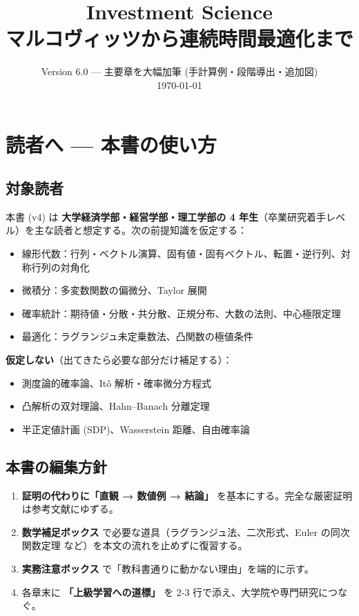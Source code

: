 \documentclass[11pt,a4paper]{report}
\title{Investment Science \\ \large マルコヴィッツから連続時間最適化まで}
\author{}
\date{Version 6.0 — 主要章を大幅加筆 (手計算例・段階導出・追加図) \\ \today}
\begin{document}
\maketitle
\tableofcontents
\clearpage

\chapter{読者へ — 本書の使い方}

\section{対象読者}

本書 (v4) は \textbf{大学経済学部・経営学部・理工学部の 4 年生}（卒業研究着手レベル）を主な読者と想定する。次の前提知識を仮定する：

\begin{itemize}
\item 線形代数：行列・ベクトル演算、固有値・固有ベクトル、転置・逆行列、対称行列の対角化
\item 微積分：多変数関数の偏微分、Taylor 展開
\item 確率統計：期待値・分散・共分散、正規分布、大数の法則、中心極限定理
\item 最適化：ラグランジュ未定乗数法、凸関数の極値条件
\end{itemize}

\textbf{仮定しない}（出てきたら必要な部分だけ補足する）：
\begin{itemize}
\item 測度論的確率論、Itô 解析・確率微分方程式
\item 凸解析の双対理論、Hahn–Banach 分離定理
\item 半正定値計画 (SDP)、Wasserstein 距離、自由確率論
\end{itemize}

\section{本書の編集方針}

\begin{enumerate}
\item \textbf{証明の代わりに「直観 → 数値例 → 結論」} を基本にする。完全な厳密証明は参考文献にゆずる。
\item \textbf{数学補足ボックス} で必要な道具（ラグランジュ法、二次形式、Euler の同次関数定理 など）を本文の流れを止めずに復習する。
\item \textbf{実務注意ボックス} で「教科書通りに動かない理由」を端的に示す。
\item 各章末に \textbf{「上級学習への道標」} を 2-3 行で添え、大学院や専門研究につなぐ。
\end{enumerate}
\end{document}
